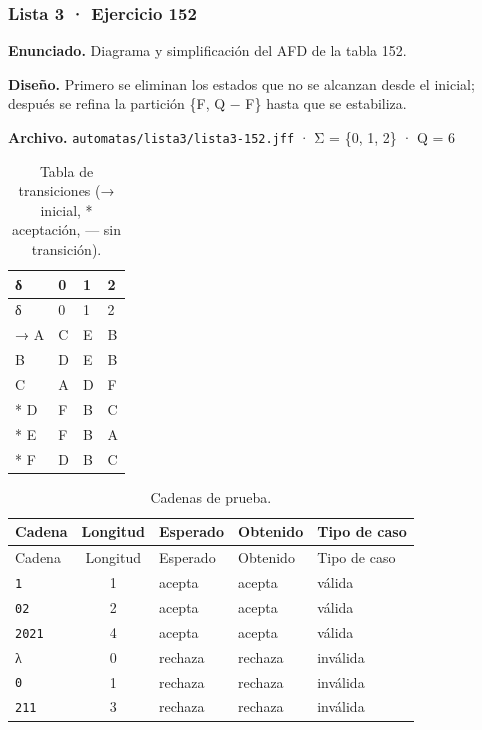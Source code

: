 
\hypertarget{lista-3-ejercicio-152}{%
\subsubsection{Lista 3 · Ejercicio 152}\label{lista-3-ejercicio-152}}

\textbf{Enunciado.} Diagrama y simplificación del AFD de la tabla 152.

\textbf{Diseño.} Primero se eliminan los estados que no se alcanzan desde el inicial; después se refina la partición \{F, Q − F\} hasta que se estabiliza.

\textbf{Archivo.} \texttt{automatas/lista3/lista3-152.jff} · Σ = \{0, 1, 2\} · \textbar Q\textbar{} = 6

\begin{longtable}[]{@{}llll@{}}
\caption{Tabla de transiciones (→ inicial, * aceptación, --- sin transición).}\tabularnewline
\toprule\noalign{}
δ & 0 & 1 & 2 \\
\midrule\noalign{}
\endfirsthead
\toprule\noalign{}
δ & 0 & 1 & 2 \\
\midrule\noalign{}
\endhead
\bottomrule\noalign{}
\endlastfoot
→ A & C & E & B \\
B & D & E & B \\
C & A & D & F \\
* D & F & B & C \\
* E & F & B & A \\
* F & D & B & C \\
\end{longtable}

\begin{longtable}[]{@{}lclll@{}}
\caption{Cadenas de prueba.}\tabularnewline
\toprule\noalign{}
Cadena & Longitud & Esperado & Obtenido & Tipo de caso \\
\midrule\noalign{}
\endfirsthead
\toprule\noalign{}
Cadena & Longitud & Esperado & Obtenido & Tipo de caso \\
\midrule\noalign{}
\endhead
\bottomrule\noalign{}
\endlastfoot
\texttt{1} & 1 & acepta & acepta & válida \\
\texttt{02} & 2 & acepta & acepta & válida \\
\texttt{2021} & 4 & acepta & acepta & válida \\
λ & 0 & rechaza & rechaza & inválida \\
\texttt{0} & 1 & rechaza & rechaza & inválida \\
\texttt{211} & 3 & rechaza & rechaza & inválida \\
\end{longtable}

